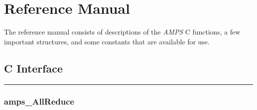 
\chapter{Reference Manual}
\label{Reference Manual}


The reference manual consists of descriptions of the {\em AMPS} C functions, a
few important structures, and some constants that are available for use.



\section{C Interface}
\label{C Interface}


\noindent\rule{\textwidth}{1mm}

\subsection{amps\_AllReduce}
\label{amps_AllReduce}


